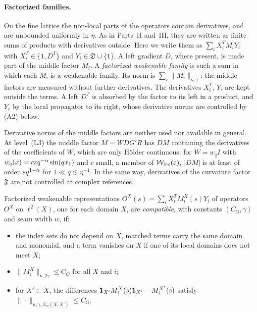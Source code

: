 \paragraph{Factorized families.} On the fine lattice the non-local parts of the operators contain derivatives, and are unbounded uniformly in $\eta$. As in Parts~II and~III, they are written as finite sums of products with derivatives outside. Here we write them as $\sum_iX_i^TM_iY_i$ with $X_i^T\in\{1,D^T\}$ and $Y_i\in\mathfrak D\cup\{1\}$. A left gradient $D$, where present, is made part of the middle factor $M_i$. A \emph{factorized weakenable family} is such a sum in which each $M_i$ is a weakenable family. Its norm is $\sum_i\|M_i\|_{\kappa,\gamma}$: the middle factors are measured without further derivatives. The derivatives $X_i^T$, $Y_i$ are kept outside the terms. A left $D^T$ is absorbed by the factor to its left in a product, and $Y_i$ by the local propagator to its right, whose derivative norms are controlled by (A2) below.

Derivative norms of the middle factors are neither used nor available in general. At level~(L3) the middle factor $M=WDG'R$ has $DM$ containing the derivatives of the coefficients of $W$, which are only H\"older continuous: for $W=w_qI$ with $w_q(x)=c\varepsilon q^{-\alpha}\sin(qx_1)$ and $c$ small, a member of $\mathcal W_{\rm loc}(\varepsilon)$, $|DM|$ is at least of order $\varepsilon q^{1-\alpha}$ for $1\ll q\lesssim\eta^{-1}$. In the same way, derivatives of the curvature factor $\mathfrak F$ are not controlled at complex references.

\begin{definition}\label{def:compatible}
Factorized weakenable representations $O^X(s)=\sum_iX_i^TM^X_i(s)Y_i$ of operators $O^X$ on $\ell^2(X)$, one for each domain $X$, are \emph{compatible}, with constants $(C_O,\gamma)$ and seam width $w$, if:
\begin{itemize}
\item the index sets do not depend on $X$, matched terms carry the same domain and monomial, and a term vanishes on $X$ if one of its local domains does not meet $X$;
\item $\|M^X_i\|_{\kappa,2\gamma}\le C_O$ for all $X$ and $i$;
\item for $X'\subset X$, the differences $\mathbf 1_{X'}M^X_i(s)\mathbf 1_{X'}-M^{X'}_i(s)$ satisfy $\|\cdot\|_{\kappa,\gamma,\Sigma_w(X,X')}\le C_O$.
\end{itemize}
\end{definition}

